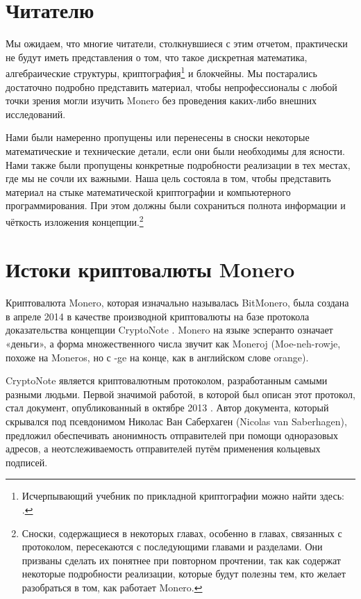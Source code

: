 \section{Читателю}

Мы ожидаем, что многие читатели, столкнувшиеся с этим отчетом, практически не будут иметь представления о том, что такое дискретная математика, алгебраические структуры, криптография\footnote{Исчерпывающий учебник по прикладной криптографии можно найти здесь: \cite{applied-cryptography-textbook}.} и блокчейны. Мы постарались достаточно подробно представить материал, чтобы непрофессионалы с любой точки зрения могли изучить Monero без проведения каких-либо внешних исследований.

Нами были намеренно пропущены или перенесены в сноски некоторые математические и технические детали, если они были необходимы для ясности. Нами также были пропущены конкретные подробности реализации в тех местах, где мы не сочли их важными. Наша цель состояла в том, чтобы представить материал на стыке математической криптографии и компьютерного программирования. При этом должны были сохраниться полнота информа\-ции и чёткость изложения концепции.\footnote{Сноски, содержащиеся в некоторых главах, особенно в главах, связанных с протоколом, пересекаются с последующими главами и разделами. Они призваны сделать их понятнее при повторном прочтении, так как содержат некоторые подробности реализации, которые будут полезны тем, кто желает разобраться в том, как работает Monero.}



\section{Истоки криптовалюты Monero}

Криптовалюта Monero, которая изначально называлась BitMonero, была создана в апреле 2014 в качестве производной криптовалюты на базе протокола доказательства концепции CryptoNote \cite{bitmonero-launched}. Monero на языке эсперанто означает «деньги», а форма множественного числа звучит как Moneroj (Moe-neh-rowje, похоже на Moneros, но с -ge на конце, как в английском слове orange).

CryptoNote является криптовалютным протоколом, разработанным самыми разными людьми. Первой значимой работой, в которой был описан этот протокол, стал документ, опубликован\-ный в октябре 2013 \cite{cryptoNoteWhitePaper}. Автор документа, который скрывался под псевдонимом Николас Ван Саберхаген (Nicolas van Saberhagen), предложил обеспечивать анонимность отправителей при помощи одноразовых адресов, а неотслеживаемость отправителей путём применения кольцевых подписей.

